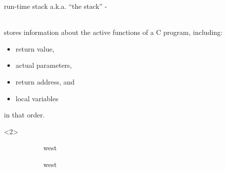 \documentclass[10pt,t,svgnames]{beamer}
\makeatletter
\newlength\tightleftmargin{}
\newlength\diffleftmargin{}
\providecommand{\nextline}{
  \setlength\labelwidth{\tightleftmargin}
  \setlength\leftmargin{\tightleftmargin}
  \advance\linewidth\diffleftmargin{}
  \advance\@totalleftmargin-\diffleftmargin{}
  \parshape\@ne\@totalleftmargin\linewidth{}
  \setlength\itemsep{1.5ex}
}
\let\origdescription\description
\let\endorigdescription\enddescription
\renewenvironment{description}{\origdescription\nextline}{\endorigdescription}
\makeatother
\begin{document}
  \begin{frame}{run-time stack a.k.a. ``the stack''}
    \begin{description}
      \item[run-time stack] \hfill \\ stores information about the active
        functions of a C program, including:
        \begin{itemize}
          \item return value,
          \item actual parameters,
          \item return address, and
          \item local variables
        \end{itemize}
        in that order.
    \end{description}

    \begin{onlyenv}<2>
      \vspace{.5\baselineskip}

      \begin{figure}
        \centering
        \begin{subfigure}[b]{.30\textwidth}
          \centering
          \begin{tikzstack}[fg]
            \begin{stack}{west}
            \end{stack}
          \end{tikzstack}
          \caption{}
        \end{subfigure}
        \quad
        \begin{subfigure}[b]{.30\textwidth}
          \centering
          \begin{tikzstack}[fg]
            \begin{stack}{west}
            \end{stack}
          \end{tikzstack}
          \caption{}
        \end{subfigure}
      \end{figure}
    \end{onlyenv}

  \end{frame}
\end{document}
